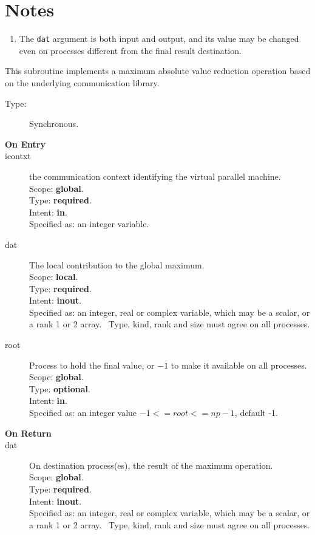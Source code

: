 \section*{Notes}
\begin{enumerate}
\item The \verb|dat| argument is both input and output, and its
  value may be changed even on processes different from the final
  result destination.
\end{enumerate}



This subroutine implements a maximum absolute value reduction
operation based on the underlying communication library. 
\begin{description}
\item[Type:] Synchronous.
\item[\bf  On Entry ]
\item[icontxt] the communication context identifying the virtual
  parallel machine.\\
Scope: {\bf global}.\\
Type: {\bf required}.\\
Intent: {\bf in}.\\
Specified as: an integer variable.
\item[dat] The local contribution to the global maximum.\\
Scope: {\bf local}.\\
Type: {\bf required}.\\
Intent: {\bf inout}.\\
Specified as: an integer, real or complex variable, which may be a
scalar, or a rank 1 or 2 array. \
Type, kind, rank and size must agree on all processes.
\item[root] Process to hold the final value, or $-1$ to make it available
  on all processes.\\
Scope: {\bf global}.\\
Type: {\bf optional}.\\
Intent: {\bf in}.\\
Specified as: an integer value $-1<= root <= np-1$, default -1. \\
\end{description}


\begin{description}
\item[\bf On Return]
\item[dat] On destination process(es), the result of the maximum operation.\\
Scope: {\bf global}.\\
Type: {\bf required}.\\
Intent: {\bf inout}.\\
Specified as: an integer, real or complex variable, which may be a
scalar, or a rank 1 or 2 array. \
Type, kind, rank and size must agree on all processes.
\end{description}


